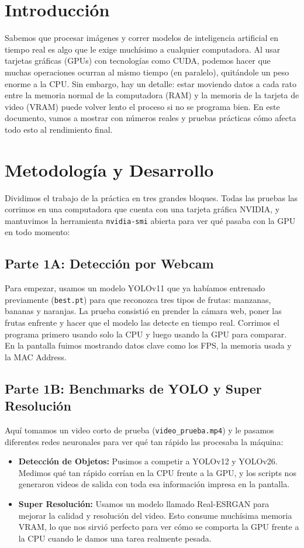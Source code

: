 \documentclass[12pt]{article}
\begin{document}
\section{Introducción}
Sabemos que procesar imágenes y correr modelos de inteligencia artificial en tiempo real es algo que le exige muchísimo a cualquier computadora. Al usar tarjetas gráficas (GPUs) con tecnologías como CUDA, podemos hacer que muchas operaciones ocurran al mismo tiempo (en paralelo), quitándole un peso enorme a la CPU. Sin embargo, hay un detalle: estar moviendo datos a cada rato entre la memoria normal de la computadora (RAM) y la memoria de la tarjeta de video (VRAM) puede volver lento el proceso si no se programa bien. En este documento, vamos a mostrar con números reales y pruebas prácticas cómo afecta todo esto al rendimiento final.

\section{Metodología y Desarrollo}

Dividimos el trabajo de la práctica en tres grandes bloques. Todas las pruebas las corrimos en una computadora que cuenta con una tarjeta gráfica NVIDIA, y mantuvimos la herramienta \texttt{nvidia-smi} abierta para ver qué pasaba con la GPU en todo momento:

\subsection{Parte 1A: Detección por Webcam}
Para empezar, usamos un modelo YOLOv11 que ya habíamos entrenado previamente (\texttt{best.pt}) para que reconozca tres tipos de frutas: manzanas, bananas y naranjas. La prueba consistió en prender la cámara web, poner las frutas enfrente y hacer que el modelo las detecte en tiempo real. Corrimos el programa primero usando solo la CPU y luego usando la GPU para comparar. En la pantalla fuimos mostrando datos clave como los FPS, la memoria usada y la MAC Address.

\subsection{Parte 1B: Benchmarks de YOLO y Super Resolución}
Aquí tomamos un video corto de prueba (\texttt{video\_prueba.mp4}) y le pasamos diferentes redes neuronales para ver qué tan rápido las procesaba la máquina:
\begin{itemize}
    \item \textbf{Detección de Objetos:} Pusimos a competir a YOLOv12 y YOLOv26. Medimos qué tan rápido corrían en la CPU frente a la GPU, y los scripts nos generaron videos de salida con toda esa información impresa en la pantalla.
    \item \textbf{Super Resolución:} Usamos un modelo llamado Real-ESRGAN para mejorar la calidad y resolución del video. Esto consume muchísima memoria VRAM, lo que nos sirvió perfecto para ver cómo se comporta la GPU frente a la CPU cuando le damos una tarea realmente pesada.
\end{itemize}
\end{document}

